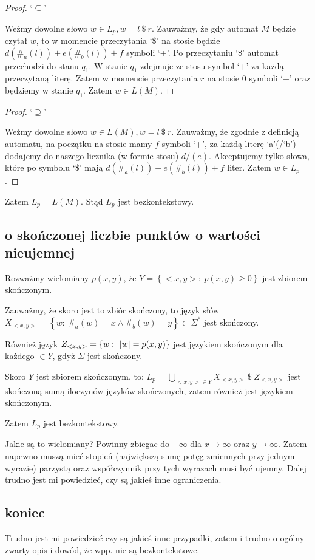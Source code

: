 \documentclass{article}
\theoremstyle{definition}
\theoremstyle{remark}
\begin{document}
\begin{proof}
    `\(\subseteq\)'

    Weźmy dowolne słowo \(w \in L_p, w = l \ \$ \ r\).
    Zauważmy, że gdy automat \(M\) będzie czytał \(w\),
    to w momencie przeczytania `\$' na stosie będzie \(d(\#_{a}(l))+e(\#_{b}(l))+f\) symboli `+'.
    Po przeczytaniu `\$' automat przechodzi do stanu \(q_1\).
    W stanie \(q_1\) zdejmuje ze stosu symbol `+' za każdą przeczytaną literę.
    Zatem w momencie przeczytania \(r\) na stosie 0 symboli `+' oraz będziemy w stanie \(q_1\).
    Zatem \(w \in L(M)\).
\end{proof}
\begin{proof}
    `\(\supseteq\)'

    Weźmy dowolne słowo \(w \in L(M), w = l \ \$ \ r\).
    Zauważmy, że zgodnie z definicją automatu,
    na początku na stosie mamy \(f\) symboli `+',
    za każdą literę `a'(/`b') dodajemy do naszego licznika (w formie stosu) \(d/(e)\).
    Akceptujemy tylko słowa, które po symbolu `\$' mają \(d(\#_{a}(l))+e(\#_{b}(l))+f\) liter.
    Zatem \(w \in L_p\).
\end{proof}

Zatem \(L_p = L(M)\).
Stąd \(L_p\) jest bezkontekstowy.

\subsection{o skończonej liczbie punktów o wartości nieujemnej}

Rozważmy wielomiany \(p(x,y)\), że \( Y = \left\{ <x,y>: \ p(x,y) \geq 0 \right\}\) jest zbiorem skończonym.

Zauważmy, że skoro jest to zbiór skończony, to język słów \( X_{<x,y>} = \left\{ w: \ \#_a(w) = x \land \#_b(w) = y \right\} \subset \Sigma^* \) jest skończony.

Również język \(Z_{<x,y>} = \left\{ w: \ \abs{w} = p(x,y) \right\}\) jest językiem skończonym dla każdego \(<x,y> \in Y\), gdyż \(\Sigma\) jest skończony.

Skoro \(Y\) jest zbiorem skończonym, to: 
\(L_p = \bigcup_{<x,y> \in Y} {X_{<x,y>}\ \$ \ Z_{<x,y>}} \) jest skończoną sumą iloczynów języków skończonych, zatem również jest językiem skończonym.

Zatem \(L_p\) jest bezkontekstowy.

Jakie są to wielomiany?
Powinny zbiegac do \(- \infty\) dla \(x \to \infty\) oraz \(y \to \infty\).
Zatem napewno muszą mieć stopień (największą sumę potęg zmiennych przy jednym wyrazie) parzystą oraz współczynnik przy tych wyrazach musi być ujemny.
Dalej trudno jest mi powiedzieć, czy są jakieś inne ograniczenia.

\subsection{koniec}

Trudno jest mi powiedzieć czy są jakieś inne przypadki, zatem i trudno o ogólny zwarty opis i dowód, że wpp. nie są bezkontekstowe.
\end{document}
